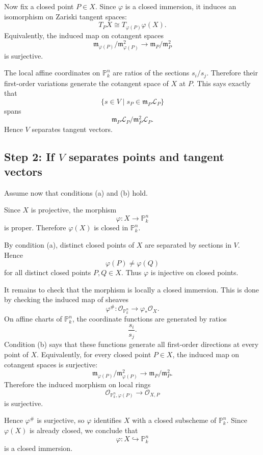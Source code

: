 \documentclass[12pt,a4paper]{article}
\theoremstyle{notespace}
\begin{document}
Now fix a closed point \(P\in X\). Since \(\varphi\) is a closed immersion, it induces an isomorphism on Zariski tangent spaces:
\[
T_PX \cong T_{\varphi(P)}\varphi(X).
\]
Equivalently, the induced map on cotangent spaces
\[
\mathfrak m_{\varphi(P)}/\mathfrak m_{\varphi(P)}^2
\longrightarrow
\mathfrak m_P/\mathfrak m_P^2
\]
is surjective.

The local affine coordinates on \(\mathbb P^n_k\) are ratios of the sections \(s_i/s_j\). Therefore their first-order variations generate the cotangent space of \(X\) at \(P\). This says exactly that
\[
\{s\in V\mid s_P\in \mathfrak m_P\mathcal L_P\}
\]
spans
\[
\mathfrak m_P\mathcal L_P/\mathfrak m_P^2\mathcal L_P.
\]
Hence \(V\) separates tangent vectors.

\subsection*{Step 2: If \(V\) separates points and tangent vectors}

Assume now that conditions (a) and (b) hold.

Since \(X\) is projective, the morphism
\[
\varphi:X\to \mathbb P^n_k
\]
is proper. Therefore \(\varphi(X)\) is closed in \(\mathbb P^n_k\).

By condition (a), distinct closed points of \(X\) are separated by sections in \(V\). Hence
\[
\varphi(P)\neq \varphi(Q)
\]
for all distinct closed points \(P,Q\in X\). Thus \(\varphi\) is injective on closed points.

It remains to check that the morphism is locally a closed immersion. This is done by checking the induced map of sheaves
\[
\varphi^\#:\mathcal O_{\mathbb P^n_k}\longrightarrow \varphi_*\mathcal O_X.
\]
On affine charts of \(\mathbb P^n_k\), the coordinate functions are generated by ratios
\[
\frac{s_i}{s_j}.
\]
Condition (b) says that these functions generate all first-order directions at every point of \(X\). Equivalently, for every closed point \(P\in X\), the induced map on cotangent spaces is surjective:
\[
\mathfrak m_{\varphi(P)}/\mathfrak m_{\varphi(P)}^2
\longrightarrow
\mathfrak m_P/\mathfrak m_P^2.
\]
Therefore the induced morphism on local rings
\[
\mathcal O_{\mathbb P^n_k,\varphi(P)}
\longrightarrow
\mathcal O_{X,P}
\]
is surjective.

Hence \(\varphi^\#\) is surjective, so \(\varphi\) identifies \(X\) with a closed subscheme of \(\mathbb P^n_k\). Since \(\varphi(X)\) is already closed, we conclude that
\[
\varphi:X\hookrightarrow \mathbb P^n_k
\]
is a closed immersion.
\end{document}
